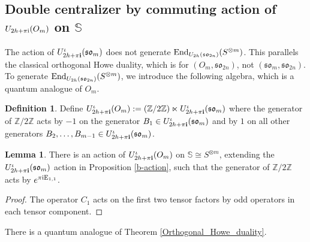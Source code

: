 \documentclass[10pt]{amsart}
\numberwithin{equation}{section}
\theoremstyle{definition}
\newtheorem{lemma}[theorem]{Lemma}
\newtheorem{definition}[theorem]{Definition}
\newcommand{\End}{{\rm End}}
\newcommand{\son}[1][2n]{\mathfrak{so}_{#1}}
\newcommand{\howespin}{\boldsymbol{\mathbb{S}}}
\begin{document}
\subsection{Double centralizer by commuting action of $U_{2h+\pi \rm{i}}(O_m)$ on $\howespin$}
The action of $U^{\iota}_{2h+\pi {\bf i}}(\mathfrak{so}_m)$ does not generate $\End_{U_{2h}(\son)}(S^{\otimes m})$. This parallels the classical orthogonal Howe duality, which is for $(O_m, \son)$, not $(\mathfrak{so}_m, \son)$. To generate $\End_{U_{2h}(\son)}(S^{\otimes m})$, we introduce the following algebra, which is a quantum analogue of $O_m$. 

\begin{definition}
    Define $ U^{\iota}_{2h+\pi {\bf i}}(O_m):=(\mathbb{Z}/2\mathbb{Z})\ltimes  U^{\iota}_{2h+\pi {\bf i}}(\mathfrak{so}_m)$ where the generator of $\mathbb{Z}/2\mathbb{Z}$ acts by $-1$ on the generator $B_1\in U^{\iota}_{2h+\pi {\bf i}}(\mathfrak{so}_m)$ and by $1$ on all other generators $B_2, \dots, B_{m-1}\in U^{\iota}_{2h+\pi {\bf i}}(\mathfrak{so}_m)$.
\end{definition}

\begin{lemma}
    There is an action of $ U^{\iota}_{2h+\pi {\bf i}}(O_m)$ on $\howespin\cong S^{\otimes m}$, extending the $U^{\iota}_{2h+\pi {\bf i}}(\mathfrak{so}_m)$ action in Proposition \ref{b-action}, such that the generator of $\mathbb{Z}/2\mathbb{Z}$ acts by $e^{\pi \rm{i} E_{1,1}}$.
\end{lemma}
\begin{proof}
    The operator $C_1$ acts on the first two tensor factors by odd operators in each tensor component.
\end{proof}

There is a quantum analogue of Theorem \ref{Orthogonal_Howe_duality}.
\end{document}
